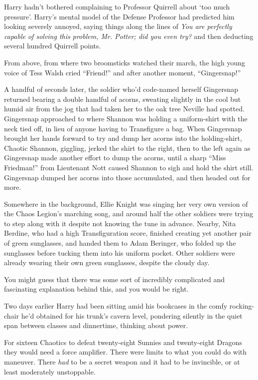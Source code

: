 Harry hadn’t bothered complaining to Professor Quirrell about
‘too much pressure’. Harry’s mental model of the Defense Professor
had predicted him looking severely annoyed, saying things along the
lines of \emph{You are perfectly capable of solving this problem, Mr.
Potter; did you even try?} and then deducting several hundred
Quirrell points.

From above, from where two broomsticks watched their march, the
high young voice of Tess Walsh cried “Friend!” and after another
moment, “Gingersnap!”

A handful of seconds later, the soldier who’d code-named herself
Gingersnap returned bearing a double handful of acorns, sweating
slightly in the cool but humid air from the jog that had taken her
to the oak tree Neville had spotted. Gingersnap approached to where
Shannon was holding a uniform-shirt with the neck tied off, in lieu
of anyone having to Transfigure a bag. When Gingersnap brought her
hands forward to try and dump her acorns into the holding-shirt,
Chaotic Shannon, giggling, jerked the shirt to the right, then to
the left again as Gingersnap made another effort to dump the
acorns, until a sharp “Miss Friedman!” from Lieutenant Nott caused
Shannon to sigh and hold the shirt still. Gingersnap dumped her
acorns into those accumulated, and then headed out for more.

Somewhere in the background, Ellie Knight was singing her very
own version of the Chaos Legion’s marching song, and around half
the other soldiers were trying to step along with it despite not
knowing the tune in advance. Nearby, Nita Berdine, who had a high
Transfiguration score, finished creating yet another pair of green
sunglasses, and handed them to Adam Beringer, who folded up the
sunglasses before tucking them into his uniform pocket. Other
soldiers were already wearing their own green sunglasses, despite
the cloudy day.

You might guess that there was some sort of incredibly
complicated and fascinating explanation behind this, and you would
be right.

Two days earlier Harry had been sitting amid his bookcases in
the comfy rocking-chair he’d obtained for his trunk’s cavern level,
pondering silently in the quiet span between classes and
dinnertime, thinking about power.

For sixteen Chaotics to defeat twenty-eight Sunnies and
twenty-eight Dragons they would need a force amplifier. There were
limits to what you could do with maneuver. There \emph{had} to be a
secret weapon and it had to be invincible, or at least moderately
unstoppable.

